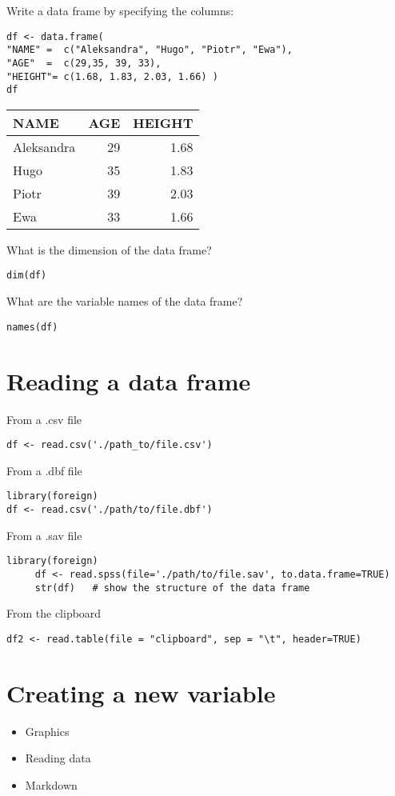 \documentclass[11pt]{article}
\begin{document}
Write a data frame by specifying the columns:

\begin{verbatim}
df <- data.frame(
"NAME" =  c("Aleksandra", "Hugo", "Piotr", "Ewa"),
"AGE"  =  c(29,35, 39, 33),
"HEIGHT"= c(1.68, 1.83, 2.03, 1.66) )
df
\end{verbatim}

\begin{center}
\begin{tabular}{lrr}
NAME & AGE & HEIGHT\\
\hline
Aleksandra & 29 & 1.68\\
Hugo & 35 & 1.83\\
Piotr & 39 & 2.03\\
Ewa & 33 & 1.66\\
\end{tabular}
\end{center}


What is the dimension of the data frame?
\begin{verbatim}
dim(df)
\end{verbatim}

What are the variable names of the data frame?
\begin{verbatim}
names(df)
\end{verbatim}



\section{Reading a data frame}
\label{sec:org403cb10}

From a .csv file

\begin{verbatim}
df <- read.csv('./path_to/file.csv')
\end{verbatim}

From a .dbf file
\begin{verbatim}
library(foreign)
df <- read.csv('./path/to/file.dbf')
\end{verbatim}

From a .sav file
\begin{verbatim}
library(foreign)
     df <- read.spss(file='./path/to/file.sav', to.data.frame=TRUE) 
     str(df)   # show the structure of the data frame
\end{verbatim}

From the clipboard
\begin{verbatim}
df2 <- read.table(file = "clipboard", sep = "\t", header=TRUE)
\end{verbatim}


\section{Creating a new variable}
\label{sec:org777e5fa}

\begin{itemize}
\item Graphics
\item Reading data
\item Markdown
\end{itemize}
\end{document}

